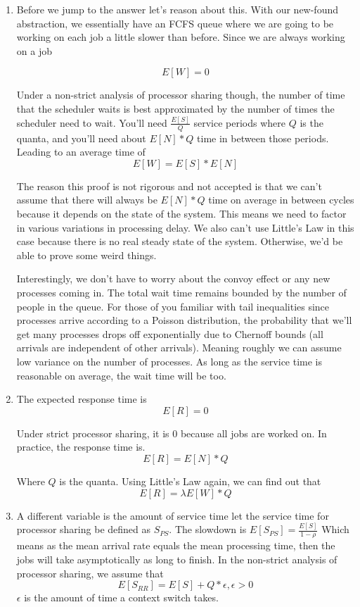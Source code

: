 \begin{enumerate}
  \item Before we jump to the answer let's reason about this.
    With our new-found abstraction, we essentially have an FCFS queue where we are going to be working on each job a little slower than before.
    Since we are always working on a job

    \[
    E[W] = 0
    \]

  Under a non-strict analysis of processor sharing though, the number of time that the scheduler waits is best approximated by the number of times the scheduler need to wait.
  You'll need $\frac{E[S]}{Q}$ service periods where $Q$ is the quanta, and you'll need about $E[N] * Q$ time in between those periods.
  Leading to an average time of
  \[
  E[W] = E[S] * E[N]
  \]

  The reason this proof is not rigorous and not accepted is that we can't assume that there will always be $E[N] * Q$ time on average in between cycles because it depends on the state of the system.
  This means we need to factor in various variations in processing delay.
  We also can't use Little's Law in this case because there is no real steady state of the system.
  Otherwise, we'd be able to prove some weird things.

  Interestingly, we don't have to worry about the convoy effect or any new processes coming in.
  The total wait time remains bounded by the number of people in the queue.
  For those of you familiar with tail inequalities since processes arrive according to a Poisson distribution, the probability that we'll get many processes drops off exponentially due to Chernoff bounds (all arrivals are independent of other arrivals).
  Meaning roughly we can assume low variance on the number of processes.
  As long as the service time is reasonable on average, the wait time will be too.

\item The expected response time is
  \[
  E[R] = 0
  \]

  Under strict processor sharing, it is 0 because all jobs are worked on.
  In practice, the response time is.
  \[
  E[R] = E[N] * Q
  \]

  Where $Q$ is the quanta.
  Using Little's Law again, we can find out that
  \[
  E[R] = \lambda E[W] * Q
  \]
\item A different variable is the amount of service time let the service time for processor sharing be defined as $S_{PS}$.
  The slowdown is $E[S_{PS}] = \frac{E[S]}{1 - \rho}$
  Which means as the mean arrival rate equals the mean processing time, then the jobs will take asymptotically as long to finish.
  In the non-strict analysis of processor sharing, we assume that
  \[
    E[S_{RR}] = E[S] + Q * \epsilon, \epsilon > 0
  \]
    $\epsilon$ is the amount of time a context switch takes.


\end{enumerate}
